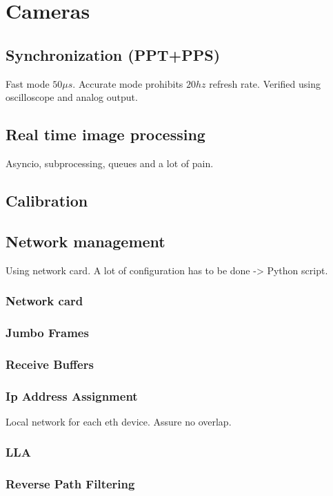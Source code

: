 \chapter{Cameras}


\section{Synchronization (PPT+PPS)}
Fast mode \approx $50\mu s$. Accurate mode prohibits $20hz$ refresh rate.
Verified using oscilloscope and analog output.

\section{Real time image processing}
Asyncio, subprocessing, queues and a lot of pain.



\section{Calibration}


\section{Network management}

Using network card.
A lot of configuration has to be done -> Python script.
\subsection*{Network card}
\subsection*{Jumbo Frames}
\subsection*{Receive Buffers}
\subsection*{Ip Address Assignment}
Local network for each eth device.
Assure no overlap.
\subsection*{LLA}
\subsection*{Reverse Path Filtering}



